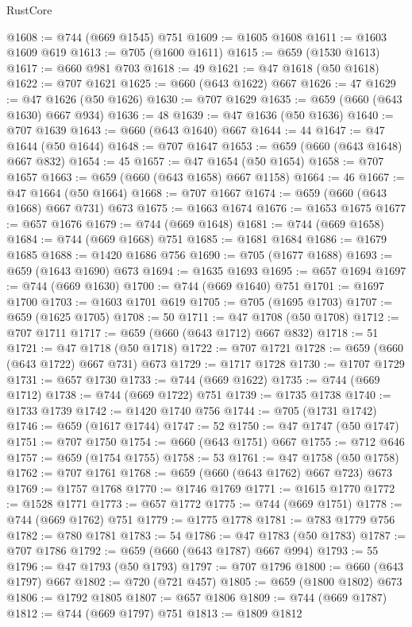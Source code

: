 \begin{lexlean}{RustCore}
\begin{coremodule}
@1608 := @744 (@669 @1545) @751
@1609 := @1605 @1608
@1611 := @1603 @1609 @619
@1613 := @705 (@1600 @1611)
@1615 := @659 (@1530 @1613)
@1617 := @660 @981 @703
@1618 := 49
@1621 := @47 @1618 (@50 @1618)
@1622 := @707 @1621
@1625 := @660 (@643 @1622) @667
@1626 := 47
@1629 := @47 @1626 (@50 @1626)
@1630 := @707 @1629
@1635 := @659 (@660 (@643 @1630) @667 @934)
@1636 := 48
@1639 := @47 @1636 (@50 @1636)
@1640 := @707 @1639
@1643 := @660 (@643 @1640) @667
@1644 := 44
@1647 := @47 @1644 (@50 @1644)
@1648 := @707 @1647
@1653 := @659 (@660 (@643 @1648) @667 @832)
@1654 := 45
@1657 := @47 @1654 (@50 @1654)
@1658 := @707 @1657
@1663 := @659 (@660 (@643 @1658) @667 @1158)
@1664 := 46
@1667 := @47 @1664 (@50 @1664)
@1668 := @707 @1667
@1674 := @659 (@660 (@643 @1668) @667 @731) @673
@1675 := @1663 @1674
@1676 := @1653 @1675
@1677 := @657 @1676
@1679 := @744 (@669 @1648)
@1681 := @744 (@669 @1658)
@1684 := @744 (@669 @1668) @751
@1685 := @1681 @1684
@1686 := @1679 @1685
@1688 := @1420 @1686 @756
@1690 := @705 (@1677 @1688)
@1693 := @659 (@1643 @1690) @673
@1694 := @1635 @1693
@1695 := @657 @1694
@1697 := @744 (@669 @1630)
@1700 := @744 (@669 @1640) @751
@1701 := @1697 @1700
@1703 := @1603 @1701 @619
@1705 := @705 (@1695 @1703)
@1707 := @659 (@1625 @1705)
@1708 := 50
@1711 := @47 @1708 (@50 @1708)
@1712 := @707 @1711
@1717 := @659 (@660 (@643 @1712) @667 @832)
@1718 := 51
@1721 := @47 @1718 (@50 @1718)
@1722 := @707 @1721
@1728 := @659 (@660 (@643 @1722) @667 @731) @673
@1729 := @1717 @1728
@1730 := @1707 @1729
@1731 := @657 @1730
@1733 := @744 (@669 @1622)
@1735 := @744 (@669 @1712)
@1738 := @744 (@669 @1722) @751
@1739 := @1735 @1738
@1740 := @1733 @1739
@1742 := @1420 @1740 @756
@1744 := @705 (@1731 @1742)
@1746 := @659 (@1617 @1744)
@1747 := 52
@1750 := @47 @1747 (@50 @1747)
@1751 := @707 @1750
@1754 := @660 (@643 @1751) @667
@1755 := @712 @646
@1757 := @659 (@1754 @1755)
@1758 := 53
@1761 := @47 @1758 (@50 @1758)
@1762 := @707 @1761
@1768 := @659 (@660 (@643 @1762) @667 @723) @673
@1769 := @1757 @1768
@1770 := @1746 @1769
@1771 := @1615 @1770
@1772 := @1528 @1771
@1773 := @657 @1772
@1775 := @744 (@669 @1751)
@1778 := @744 (@669 @1762) @751
@1779 := @1775 @1778
@1781 := @783 @1779 @756
@1782 := @780 @1781
@1783 := 54
@1786 := @47 @1783 (@50 @1783)
@1787 := @707 @1786
@1792 := @659 (@660 (@643 @1787) @667 @994)
@1793 := 55
@1796 := @47 @1793 (@50 @1793)
@1797 := @707 @1796
@1800 := @660 (@643 @1797) @667
@1802 := @720 (@721 @457)
@1805 := @659 (@1800 @1802) @673
@1806 := @1792 @1805
@1807 := @657 @1806
@1809 := @744 (@669 @1787)
@1812 := @744 (@669 @1797) @751
@1813 := @1809 @1812

\end{coremodule}
\end{lexlean}
